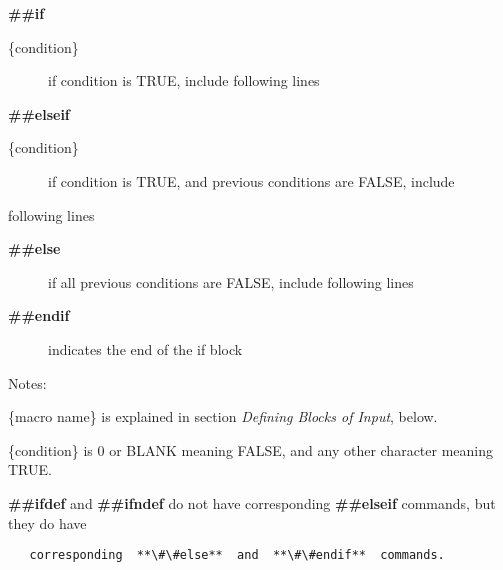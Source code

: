 \textbf{\#\#if}

\begin{description}
\item[\{condition\}]
if condition is TRUE, include following lines
\end{description}

\textbf{\#\#elseif}

\begin{description}
\item[\{condition\}]
if condition is TRUE, and previous conditions are FALSE, include
\end{description}

following lines

\begin{description}
\item[\textbf{\#\#else}]
if all previous conditions are FALSE, include following lines
\item[\textbf{\#\#endif}]
indicates the end of the if block
\end{description}

Notes:

\{macro name\} is explained in section \emph{Defining Blocks of Input}, below.

\{condition\} is 0 or BLANK meaning FALSE, and any other character meaning TRUE.

\textbf{\#\#ifdef} and \textbf{\#\#ifndef} do not have corresponding \textbf{\#\#elseif} commands, but they do have

\begin{lstlisting}
   corresponding  **\#\#else**  and  **\#\#endif**  commands.
\end{lstlisting}
